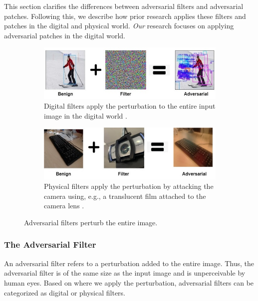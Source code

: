 This section clarifies the differences between adversarial filters and adversarial patches. Following this, we describe how prior research applies these filters and patches in the digital and physical world. \emph{Our} research focuses on applying adversarial patches in the digital world.

\begin{figure}[b]
    \centering
    \begin{subfigure}[b]{0.42\textwidth}
        \includegraphics[width=1\linewidth]{figures/chapter_detection/digital_filter.jpg}
        \caption{Digital filters apply the perturbation to the entire input image in the digital world \citep{wang2021daedalus}.}
        \label{fig:digital_filter}
    \end{subfigure}
    \begin{subfigure}[b]{0.42\textwidth}
        \includegraphics[width=1\linewidth]{figures/chapter_detection/physical_filter.jpg}
        \caption{Physical filters apply the perturbation by attacking the camera using, e.g., a translucent film attached to the camera lens \citep{li2019adversarial}.}
        \label{fig:physical_filter}
    \end{subfigure}
    \caption{Adversarial filters perturb the entire image.}
    \label{fig:filter}
\end{figure}

\subsubsection{The Adversarial Filter}

An adversarial filter refers to a perturbation added to the entire image. Thus, the adversarial filter is of the same size as the input image and is unperceivable by human eyes. Based on where we apply the perturbation, adversarial filters can be categorized as digital or physical filters.

